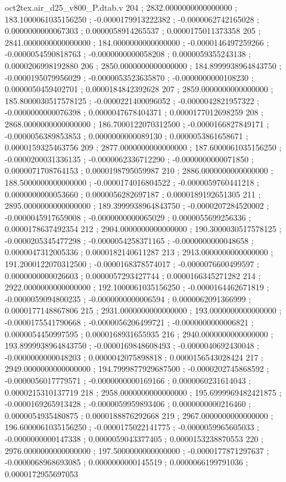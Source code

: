 \begin{filecontents}[overwrite]{oct2tex.air_d25_v800_P.dtab.v}
204 ; 2832.0000000000000000 ; 183.1000061035156250 ; -0.0000179913222382 ; -0.0000062742165028 ; 0.0000000000067303 ; 0.0000058914265537 ; 0.0000175011373358
205 ; 2841.0000000000000000 ; 184.0000000000000000 ; -0.0000146497259266 ; -0.0000054590818763 ; -0.0000000000058208 ; 0.0000059355243138 ; 0.0000206998192880
206 ; 2850.0000000000000000 ; 184.8999938964843750 ; -0.0000195079956029 ; -0.0000053523635870 ; -0.0000000000108230 ; 0.0000050459402701 ; 0.0000184842392628
207 ; 2859.0000000000000000 ; 185.8000030517578125 ; -0.0000221400096052 ; -0.0000042821957322 ; -0.0000000000076398 ; 0.0000047678404371 ; 0.0000177012698259
208 ; 2868.0000000000000000 ; 186.7000122070312500 ; -0.0000166827849171 ; -0.0000056389853853 ; 0.0000000000089130 ; 0.0000053861658671 ; 0.0000159325463756
209 ; 2877.0000000000000000 ; 187.6000061035156250 ; -0.0000200031336135 ; -0.0000062336712290 ; -0.0000000000071850 ; 0.0000071708764153 ; 0.0000198795059987
210 ; 2886.0000000000000000 ; 188.5000000000000000 ; -0.0000174016804522 ; -0.0000059760441218 ; 0.0000000000053660 ; 0.0000056282697187 ; 0.0000189192651305
211 ; 2895.0000000000000000 ; 189.3999938964843750 ; -0.0000207284520002 ; -0.0000045917659008 ; -0.0000000000065029 ; 0.0000055699256336 ; 0.0000178637492354
212 ; 2904.0000000000000000 ; 190.3000030517578125 ; -0.0000205345477298 ; -0.0000054258371165 ; -0.0000000000048658 ; 0.0000047312005336 ; 0.0000182140611287
213 ; 2913.0000000000000000 ; 191.2000122070312500 ; -0.0000168378574017 ; -0.0000076600499597 ; 0.0000000000026603 ; 0.0000057293427744 ; 0.0000166345271282
214 ; 2922.0000000000000000 ; 192.1000061035156250 ; -0.0000164462671819 ; -0.0000059094800235 ; -0.0000000000006594 ; 0.0000062091366999 ; 0.0000177148867806
215 ; 2931.0000000000000000 ; 193.0000000000000000 ; -0.0000175541790668 ; -0.0000056206499721 ; -0.0000000000006821 ; 0.0000054450997595 ; 0.0000168931655935
216 ; 2940.0000000000000000 ; 193.8999938964843750 ; -0.0000169848608493 ; -0.0000040692430048 ; -0.0000000000048203 ; 0.0000042075898818 ; 0.0000156543028424
217 ; 2949.0000000000000000 ; 194.7999877929687500 ; -0.0000202745868592 ; -0.0000056017779571 ; -0.0000000000169166 ; 0.0000060231614043 ; 0.0000215310137719
218 ; 2958.0000000000000000 ; 195.6999969482421875 ; -0.0000169265913428 ; -0.0000059959893406 ; 0.0000000000216460 ; 0.0000054935480875 ; 0.0000188876292668
219 ; 2967.0000000000000000 ; 196.6000061035156250 ; -0.0000175022141775 ; -0.0000059965605033 ; -0.0000000000147338 ; 0.0000059043377405 ; 0.0000153238870553
220 ; 2976.0000000000000000 ; 197.5000000000000000 ; -0.0000177871297637 ; -0.0000068968693085 ; 0.0000000000145519 ; 0.0000066199791036 ; 0.0000172955697053

\end{filecontents}
